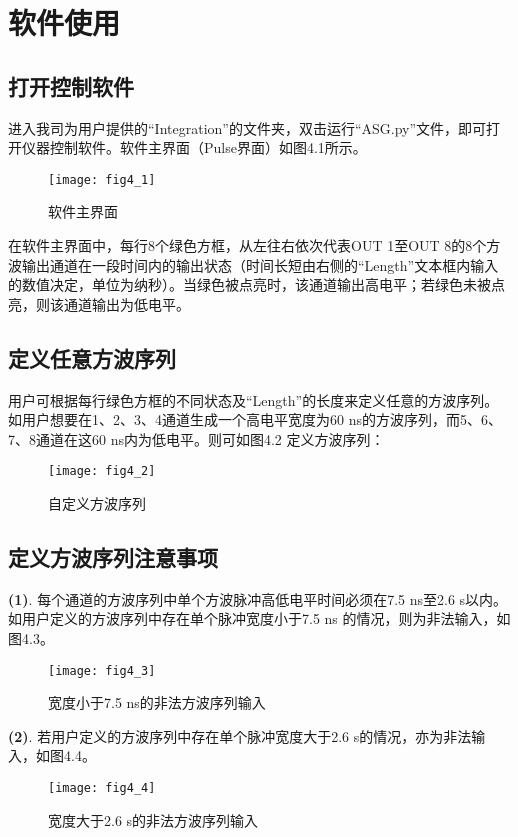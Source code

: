 \chapter{\heiti 软件使用}
\section{\heiti 打开控制软件}
进入我司为用户提供的“Integration”的文件夹，双击运行“ASG.py”文件，即可打开仪器控制软件。软件主界面（Pulse界面）如图4.1所示。
\begin{figure}[ht]
\centering
\texttt{[image: fig4\_1]}
\caption{软件主界面}
\end{figure}

在软件主界面中，每行8个绿色方框，从左往右依次代表OUT 1至OUT 8的8个方波输出通道在一段时间内的输出状态（时间长短由右侧的“Length”文本框内输入的数值决定，单位为纳秒）。当绿色被点亮时，该通道输出高电平；若绿色未被点亮，则该通道输出为低电平。

\section{\heiti 定义任意方波序列}
用户可根据每行绿色方框的不同状态及“Length”的长度来定义任意的方波序列。如用户想要在1、2、3、4通道生成一个高电平宽度为60 ns的方波序列，而5、6、7、8通道在这60 ns内为低电平。则可如图4.2 定义方波序列：
\begin{figure}[ht]
\centering
\texttt{[image: fig4\_2]}
\caption{自定义方波序列}
\end{figure}

\section{\heiti 定义方波序列注意事项}
\noindent \textbf{(1)}. 每个通道的方波序列中单个方波脉冲高低电平时间必须在7.5 ns至2.6 s以内。如用户定义的方波序列中存在单个脉冲宽度小于7.5 ns 的情况，则为非法输入，如图4.3。
\begin{figure}[H]
\centering
\texttt{[image: fig4\_3]}
\caption{宽度小于7.5 ns的非法方波序列输入}
\end{figure}

\newpage
\noindent \textbf{(2)}.  若用户定义的方波序列中存在单个脉冲宽度大于2.6 s的情况，亦为非法输入，如图4.4。
\begin{figure}[ht]
\centering
\texttt{[image: fig4\_4]}
\caption{宽度大于2.6 s的非法方波序列输入}
\end{figure}

